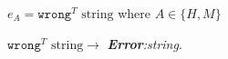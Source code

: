\begin{case}
$e_{A}=\mathtt{wrong}^{T}$ $\mathrm{string}$ where $A\in\lbrace H,M\rbrace$

$\mathtt{wrong}^{T}$ $\mathrm{string}\rightarrow$ \emph{\textbf{Error}:\;string}.
\end{case}